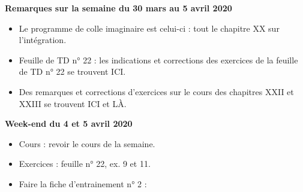 \documentclass[12pt,a4paper]{article}
\begin{document}
% 
% 
% 
% 

 
\noindent\textbf{\bf Remarques sur la semaine du 30 mars au 5 avril 2020}
\begin{itemize}
\item Le programme de colle imaginaire est celui-ci : tout le chapitre XX sur l'intégration.
\item Feuille de TD n° 22 : les indications et corrections des exercices de la feuille de TD n° 22 se trouvent ICI.
\item Des remarques et corrections d'exercices sur le cours des chapitres XXII et XXIII se trouvent ICI et LÀ.\vspace{.4cm}
\end{itemize}

\noindent\textbf{Week-end du 4 et 5 avril 2020}
\begin{itemize}
\item Cours : revoir le cours de la semaine.
\item Exercices : feuille n° 22, ex. 9 et 11.
\item Faire la fiche d'entrainement n° 2 : 
\vspace{.4cm}
\end{itemize}
\end{document}

